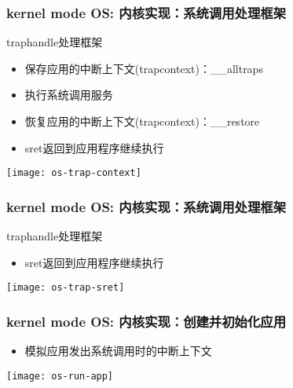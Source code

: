 \begin{frame}
    \frametitle{kernel mode OS: 内核实现：系统调用处理框架}
    trap\-handle处理框架
    \begin{itemize}
        
        \item 保存应用的中断上下文(trap\-context)：\_\_alltraps
        \item 执行系统调用服务
        \item 恢复应用的中断上下文(trap\-context)：\_\_restore
        \item sret返回到应用程序继续执行
    \end{itemize}	
    \centering
    \texttt{[image: os-trap-context]}
\end{frame}

\begin{frame}
    \frametitle{kernel mode OS: 内核实现：系统调用处理框架}
    trap\-handle处理框架
    \begin{itemize}
        \item sret返回到应用程序继续执行
    \end{itemize}	
    \centering
    \texttt{[image: os-trap-sret]}
\end{frame}

\begin{frame}
    \frametitle{kernel mode OS: 内核实现：创建并初始化应用}

    \begin{itemize}
        \item 模拟应用发出系统调用时的中断上下文
    \end{itemize}	
    \centering
    \texttt{[image: os-run-app]}
\end{frame}

